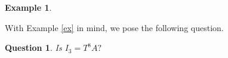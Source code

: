 \documentclass[a4paper,12pt]{article}
\newtheorem{ex}[thm]{Example}
\newtheorem{ques}[thm]{Question}
\begin{document}
{\begin{ex}
{}
\end{ex}

\noindent With Example \ref{ex} in mind, we pose the following question.

\smallskip
\begin{ques}\label{Q1}
\it{Is $I_3= T^8A?$}
\end{ques}

%
%
%
%
%
%


}
\end{document}
